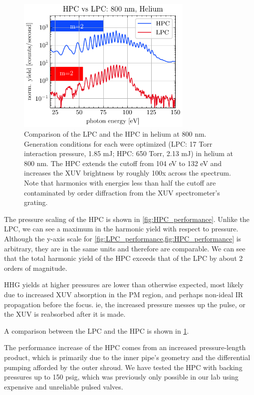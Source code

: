\begin{figure}
	\centering
	\includegraphics[width=0.75\textwidth]{figures/chap3/HPC_vs_LPC_800He.pdf}
	\caption{Comparison of the LPC and the HPC in helium at 800 nm. Generation conditions for each were optimized (LPC: 17 Torr interaction pressure, 1.85 mJ; HPC: 650 Torr, 2.13 mJ) in helium at 800 nm. The HPC extends the cutoff from 104 eV to 132 eV and increases the XUV brightness by roughly 100x across the spectrum. Note that harmonics with energies less than half the cutoff are contaminated by  order diffraction from the XUV spectrometer's grating.}
	\label{fig:HHG-HPCvsLPCHPC}
\end{figure}

The pressure scaling of the HPC is shown in \cref{fig:HPC_performance}. Unlike the LPC, we can see a maximum in the harmonic yield with respect to pressure. Although the y-axis scale for \cref{fig:LPC_performance,fig:HPC_performance} is arbitrary, they are in the same units and therefore are comparable. We can see that the total harmonic yield of the HPC exceeds that of the LPC by about 2 orders of magnitude.

HHG yields at higher pressures are lower than otherwise expected, most likely due to increased XUV absorption in the PM region, and perhaps non-ideal IR propagation before the focus. ie, the increased pressure messes up the pulse, or the XUV is reabsorbed after it is made.

A comparison between the LPC and the HPC is shown in \cref{fig:HHG-HPCvsLPCHPC}.

The performance increase of the HPC comes from an increased pressure-length product, which is primarily due to the inner pipe's geometry and the differential pumping afforded by the outer shroud. We have tested the HPC with backing pressures up to 150 psig, which was previously only possible in our lab using expensive and unreliable pulsed valves.


